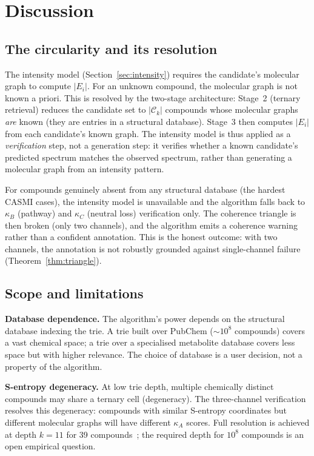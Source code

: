 \documentclass[twocolumn,10pt,a4paper]{article}
\theoremstyle{thmstyle}
\theoremstyle{definition}
\theoremstyle{remark}
\newcommand{\calC}{\mathcal{C}}
\begin{document}
\section{Discussion}
\label{sec:discussion}

\subsection{The circularity and its resolution}

The intensity model (Section~\ref{sec:intensity}) requires the
candidate's molecular graph to compute $|E_i|$. For an unknown
compound, the molecular graph is not known a priori. This is resolved
by the two-stage architecture: Stage~2 (ternary retrieval) reduces the
candidate set to $|\calC_k|$ compounds whose molecular graphs \emph{are}
known (they are entries in a structural database). Stage~3 then
computes $|E_i|$ from each candidate's known graph. The intensity
model is thus applied as a \emph{verification} step, not a generation
step: it verifies whether a known candidate's predicted spectrum
matches the observed spectrum, rather than generating a molecular graph
from an intensity pattern.

For compounds genuinely absent from any structural database (the
hardest CASMI cases), the intensity model is unavailable and the
algorithm falls back to $\kappa_B$ (pathway) and $\kappa_C$ (neutral
loss) verification only. The coherence triangle is then broken (only
two channels), and the algorithm emits a coherence warning rather than
a confident annotation. This is the honest outcome: with two channels,
the annotation is not robustly grounded against single-channel failure
(Theorem~\ref{thm:triangle}).

\subsection{Scope and limitations}

\textbf{Database dependence.} The algorithm's power depends on the
structural database indexing the trie. A trie built over PubChem
($\sim 10^8$ compounds) covers a vast chemical space; a trie over a
specialised metabolite database covers less space but with higher
relevance. The choice of database is a user decision, not a property of
the algorithm.

\textbf{S-entropy degeneracy.} At low trie depth, multiple chemically
distinct compounds may share a ternary cell (degeneracy). The three-channel
verification resolves this degeneracy: compounds with similar S-entropy
coordinates but different molecular graphs will have different
$\kappa_A$ scores. Full resolution is achieved at depth $k = 11$ for
39 compounds~\citep{sachikonye2024generative}; the required depth for
$10^8$ compounds is an open empirical question.
\end{document}
